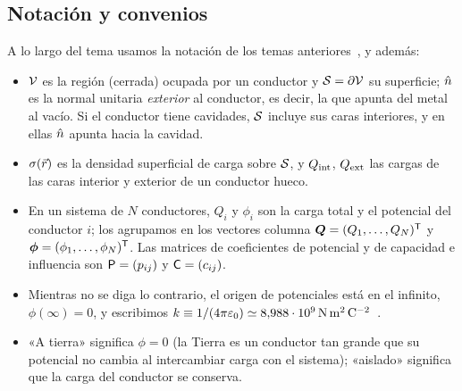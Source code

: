 \subsection{Notación y convenios}\label{sec:notacion}
\begin{notacion}\label{not:tema3}
A lo largo del tema usamos la notación de los temas anteriores~\cite{TEMA0,TEMA1,TEMA2}, y además:
\begin{itemize}
  \item $\mathcal{V}$ es la región (cerrada) ocupada por un conductor y $\mathcal{S}=\partial\mathcal{V}$ su superficie; $\hat{n}$ es la normal unitaria \emph{exterior} al
        conductor, es decir, la que apunta del metal al vacío. Si el conductor tiene cavidades, $\mathcal{S}$ incluye sus caras interiores, y en ellas
        $\hat{n}$ apunta hacia la cavidad.
  \item $\sigma(\vec{r})$ es la densidad superficial de carga sobre $\mathcal{S}$, y $Q_{\mathrm{int}}$, $Q_{\mathrm{ext}}$ las cargas de las caras interior y exterior de un
        conductor hueco.
  \item En un sistema de $N$ conductores, $Q_i$ y $\phi_i$ son la carga total y el potencial del conductor $i$; los agrupamos en los vectores
        columna $\bm{Q}=(Q_1,\dots,Q_N)^{\mathsf{T}}$ y $\bm{\phi}=(\phi_1,\dots,\phi_N)^{\mathsf{T}}$. Las matrices de coeficientes de potencial y de capacidad e influencia
        son $\mathsf{P}=(p_{ij})$ y $\mathsf{C}=(c_{ij})$.
  \item Mientras no se diga lo contrario, el origen de potenciales está en el infinito, $\phi(\infty)=0$, y escribimos
        $k\equiv1/(4\pi\varepsilon_{0})\simeq8{,}988\cdot10^{9}\,\mathrm{N\,m^{2}\,C^{-2}}$~\cite{CODATA}.
  \item «A tierra» significa $\phi=0$ (la Tierra es un conductor tan grande que su potencial no cambia al intercambiar carga con el sistema);
        «aislado» significa que la carga del conductor se conserva.
\end{itemize}
\end{notacion}
